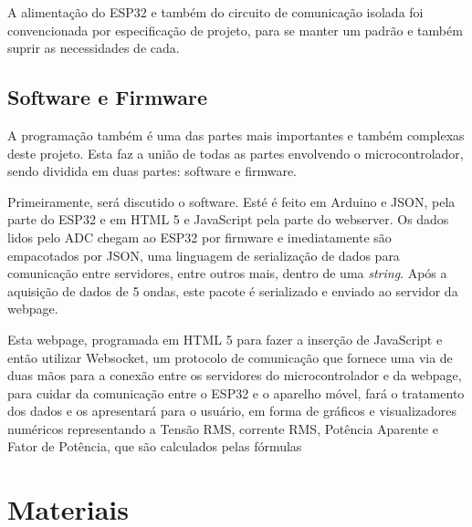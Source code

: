 A alimentação do ESP32 e também do circuito de comunicação isolada foi convencionada por especificação de projeto, para se manter um padrão e também suprir as necessidades de cada.

\subsection{Software e Firmware}\label{softfirm}

A programação também é uma das partes mais importantes e também complexas deste projeto. Esta faz a união de todas as partes envolvendo o microcontrolador, sendo dividida em duas partes: software e firmware.

Primeiramente, será discutido o software. Esté é feito em Arduino e JSON, pela parte do ESP32 e em HTML 5 e JavaScript pela parte do webserver. Os dados lidos pelo \gls{ADC} chegam ao ESP32 por firmware e imediatamente são empacotados por JSON, uma linguagem de serialização de dados para comunicação entre servidores, entre outros mais, dentro de uma \textit{string}. Após a aquisição de dados de 5 ondas, este pacote é serializado e enviado ao servidor da webpage.

Esta webpage, programada em HTML 5 para fazer a inserção de JavaScript e então utilizar Websocket, um protocolo de comunicação que fornece uma via de duas mãos para a conexão entre os servidores do microcontrolador e da webpage, para cuidar da comunicação entre o ESP32 e o aparelho móvel, fará o tratamento dos dados e os apresentará para o usuário, em forma de gráficos e visualizadores numéricos representando a Tensão RMS, corrente RMS, Potência Aparente e Fator de Potência, que são calculados pelas fórmulas


\section{Materiais}\label{sec:materiais}

